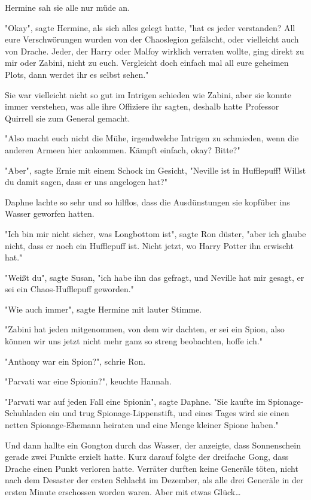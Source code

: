 {Hermine sah sie alle nur müde an.

"Okay", sagte Hermine, als sich alles gelegt hatte, "hat es jeder verstanden? All eure Verschwörungen wurden von der Chaoslegion gefälscht, oder vielleicht auch von Drache. Jeder, der Harry oder Malfoy wirklich verraten wollte, ging direkt zu mir oder Zabini, nicht zu euch. Vergleicht doch einfach mal all eure geheimen Plots, dann werdet ihr es selbst sehen."

Sie war vielleicht nicht so gut im Intrigen schieden wie Zabini, aber sie konnte immer verstehen, was alle ihre Offiziere ihr sagten, deshalb hatte Professor Quirrell sie zum General gemacht.

"Also macht euch nicht die Mühe, irgendwelche Intrigen zu schmieden, wenn die anderen Armeen hier ankommen. Kämpft einfach, okay? Bitte?"

"Aber", sagte Ernie mit einem Schock im Gesicht, "Neville ist in Hufflepuff! Willst du damit sagen, dass er uns angelogen hat?"

Daphne lachte so sehr und so hilflos, dass die Ausdünstungen sie kopfüber ins Wasser geworfen hatten.

"Ich bin mir nicht sicher, was Longbottom ist", sagte Ron düster, "aber ich glaube nicht, dass er noch ein Hufflepuff ist. Nicht jetzt, wo Harry Potter ihn erwischt hat."

"Weißt du", sagte Susan, "ich habe ihn das gefragt, und Neville hat mir gesagt, er sei ein Chaos-Hufflepuff geworden."

"Wie auch immer", sagte Hermine mit lauter Stimme.

"Zabini hat jeden mitgenommen, von dem wir dachten, er sei ein Spion, also können wir uns jetzt nicht mehr ganz so streng beobachten, hoffe ich."

"Anthony war ein Spion?", schrie Ron.

"Parvati war eine Spionin?", keuchte Hannah.

"Parvati war auf jeden Fall eine Spionin", sagte Daphne. "Sie kaufte im Spionage-Schuhladen ein und trug Spionage-Lippenstift, und eines Tages wird sie einen netten Spionage-Ehemann heiraten und eine Menge kleiner Spione haben."

Und dann hallte ein Gongton durch das Wasser, der anzeigte, dass Sonnenschein gerade zwei Punkte erzielt hatte. Kurz darauf folgte der dreifache Gong, dass Drache einen Punkt verloren hatte. Verräter durften keine Generäle töten, nicht nach dem Desaster der ersten Schlacht im Dezember, als alle drei Generäle in der ersten Minute erschossen worden waren. Aber mit etwas Glück…

}
